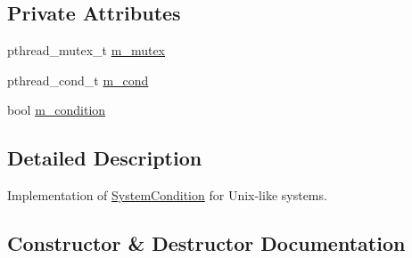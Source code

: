 \subsection*{Private Attributes}
\begin{DoxyCompactItemize}
\item 
pthread\+\_\+mutex\+\_\+t \hyperlink{classns3_1_1SystemConditionPrivate_abb57bb9b2d0d6459ea861ff1eef5959e}{m\+\_\+mutex}
\item 
pthread\+\_\+cond\+\_\+t \hyperlink{classns3_1_1SystemConditionPrivate_a812da27a9c28ef6191f6defa019a02d4}{m\+\_\+cond}
\item 
bool \hyperlink{classns3_1_1SystemConditionPrivate_abab2c2936fff504312d0c30f0ca1e145}{m\+\_\+condition}
\end{DoxyCompactItemize}


\subsection{Detailed Description}
Implementation of \hyperlink{classns3_1_1SystemCondition}{System\+Condition} for Unix-\/like systems. 

\subsection{Constructor \& Destructor Documentation}

